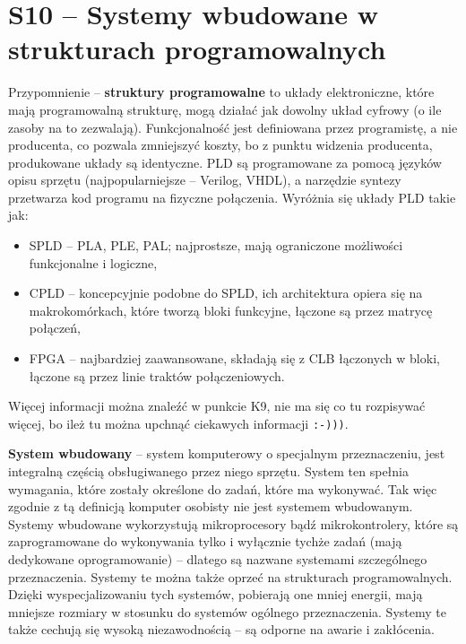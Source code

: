 \section{S10 -- Systemy wbudowane w strukturach programowalnych}

Przypomnienie -- \textbf{struktury programowalne} to układy elektroniczne, które mają programowalną strukturę, mogą działać jak dowolny układ cyfrowy (o ile zasoby na to zezwalają). Funkcjonalność jest definiowana przez programistę, a nie producenta, co pozwala zmniejszyć koszty, bo z punktu widzenia producenta, produkowane układy są identyczne. PLD są programowane za pomocą języków opisu sprzętu (najpopularniejsze -- Verilog, VHDL), a narzędzie syntezy przetwarza kod programu na fizyczne połączenia. Wyróżnia się układy PLD takie jak: 
\begin{itemize}
\item SPLD -- PLA, PLE, PAL; najprostsze, mają ograniczone możliwości funkcjonalne i logiczne,
\item CPLD -- koncepcyjnie podobne do SPLD, ich architektura opiera się na makrokomórkach, które tworzą bloki funkcyjne, łączone są przez matrycę połączeń,
\item FPGA -- najbardziej zaawansowane, składają się z CLB łączonych w bloki, łączone są przez linie traktów połączeniowych.
\end{itemize}
Więcej informacji można znaleźć w punkcie K9, nie ma się co tu rozpisywać więcej, bo ileż tu można upchnąć ciekawych informacji \texttt{:-)))}.

\textbf{System wbudowany} -- system komputerowy o specjalnym przeznaczeniu, jest integralną częścią obsługiwanego przez niego sprzętu. System ten spełnia wymagania, które zostały określone do zadań, które ma wykonywać. Tak więc zgodnie z tą definicją komputer osobisty nie jest systemem wbudowanym. Systemy wbudowane wykorzystują mikroprocesory bądź mikrokontrolery, które są zaprogramowane do wykonywania tylko i wyłącznie tychże zadań (mają dedykowane oprogramowanie) -- dlatego są nazwane systemami szczególnego przeznaczenia. Systemy te można także oprzeć na strukturach programowalnych. Dzięki wyspecjalizowaniu tych systemów, pobierają one mniej energii, mają mniejsze rozmiary w stosunku do systemów ogólnego przeznaczenia. Systemy te także cechują się wysoką niezawodnością -- są odporne na awarie i zakłócenia.

